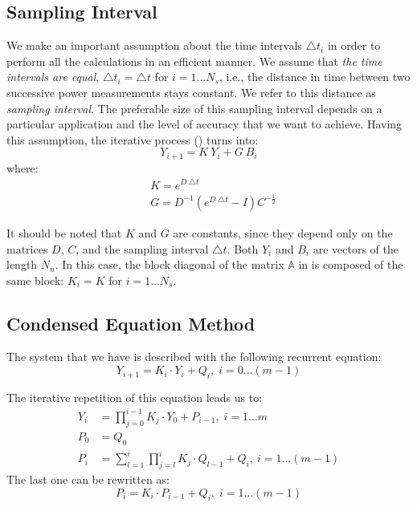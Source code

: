 \subsection{Sampling Interval}
We make an important assumption about the time intervals $\triangle t_i$ in order to perform all the calculations in an efficient manner. We assume that \emph{the time intervals are equal}, $\triangle t_i = \triangle t$ for $i = 1 \dots N_s$, i.e., the distance in time between two successive power measurements stays constant. We refer to this distance as \emph{sampling interval}. The preferable size of this sampling interval depends on a particular application and the level of accuracy that we want to achieve. Having this assumption, the iterative process () turns into:
\[
  Y_{i+1} = K \: Y_i + G \: B_i
\]
where:
\begin{align*}
  & K = e^{D \: \triangle t} \\
  & G = D^{-1} \left( e^{D \: \triangle t} - I \right) C^{-\frac{1}{2}}
\end{align*}

It should be noted that $K$ and $G$ are constants, since they depend only on the matrices $D$, $C$, and the sampling interval $\triangle t$. Both $Y_i$ and $B_i$ are vectors of the length $N_n$. In this case, the block diagonal of the matrix $\mathbb{A}$ in  is composed of the same block: $K_i = K$ for $i = 1 \dots N_s$.

\subsection{Condensed Equation Method}
The system that we have is described with the following recurrent equation:
\begin{equation} \label{eq:recurrent}
  Y_{i + 1} = K_i \cdot Y_i + Q_i, \; i = 0 \dots (m - 1)
\end{equation}

The iterative repetition of this equation leads us to:
\begin{align}
  Y_i & = \prod_{j = 0}^{i - 1} K_j \cdot Y_0 + P_{i - 1}, \; i = 1 \dots m \label{eq:y-recurrent} \\
  P_0 & = Q_0 \nonumber \\
  P_i & = \sum_{l = 1}^i \prod_{j = l}^i K_j \cdot Q_{l - 1} + Q_i, \: i = 1 \dots (m - 1) \nonumber
\end{align}
The last one can be rewritten as:
\begin{equation} \label{eq:p-recurrent}
  P_i = K_i \cdot P_{i - 1} + Q_i, \; i = 1 \dots (m - 1)
\end{equation}

